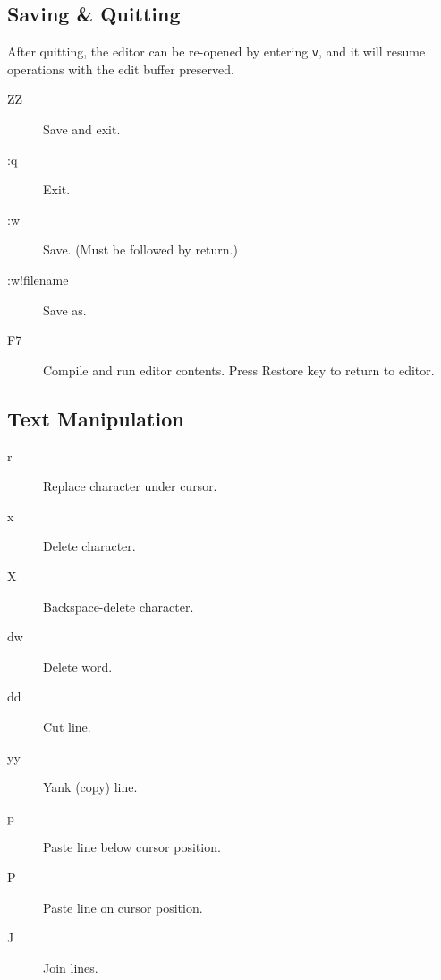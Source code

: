 \subsection{Saving \& Quitting}

After quitting, the editor can be re-opened by entering \texttt{v}, and it will resume operations with the edit buffer preserved.

\begin{description}
\item[ZZ] Save and exit.
\item[:q] Exit.
\item[:w] Save. (Must be followed by return.)
\item[:w!filename] Save as.
\item[F7] Compile and run editor contents. Press Restore key to return to editor.
\end{description}

\subsection{Text Manipulation}
\begin{description}
\item[r] Replace character under cursor.
\item[x] Delete character.
\item[X] Backspace-delete character.
\item[dw] Delete word.
\item[dd] Cut line.
\item[yy] Yank (copy) line.
\item[p] Paste line below cursor position.
\item[P] Paste line on cursor position.
\item[J] Join lines.
\end{description}
